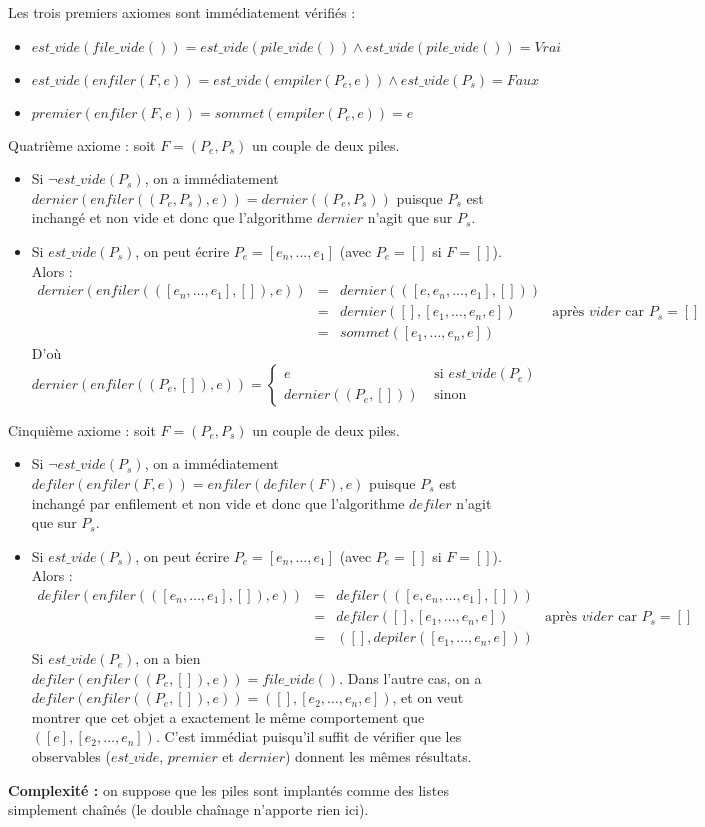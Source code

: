 \documentclass[../main.tex]{subfiles}
\begin{document}
Les trois premiers axiomes sont immédiatement vérifiés :
\begin{itemize}
	\item $est\_vide(file\_vide()) = est\_vide(pile\_vide()) \wedge est\_vide(pile\_vide()) = \textit{Vrai}$
	\item $est\_vide(enfiler(F, e)) = est\_vide(empiler(P_e, e)) \wedge est\_vide(P_s) = \textit{Faux}$
	\item $premier(enfiler(F, e)) = sommet(empiler(P_e, e)) = e$
\end{itemize}
Quatrième axiome : soit $F = (P_e, P_s)$ un couple de deux piles. 
\begin{itemize}
	\item Si $\neg est\_vide(P_s)$, on a immédiatement $dernier(enfiler((P_e, P_s), e)) = dernier((P_e, P_s))$ puisque $P_s$ est inchangé et non vide et donc que l'algorithme $dernier$ n'agit que sur $P_s$.
	\item Si $est\_vide(P_s)$, on peut écrire $P_e = [e_n, \dots, e_1]$ (avec $P_e = []$ si $F = []$). Alors :
$$\begin{array}{lcll}
dernier(enfiler(([e_n, \dots, e_1], []), e)) & = & dernier(([e, e_n, \dots, e_1], [])) \\
& = & dernier([], [e_1, \dots, e_n, e]) & \text{après $vider$ car $P_s = []$} \\
& = & sommet([e_1, \dots, e_n, e])
\end{array}
$$
D'où $dernier(enfiler((P_e, []), e)) = \left\{\begin{array}{ll}e & \text{ si } est\_vide(P_e)\\ dernier((P_e, [])) & \text{ sinon}\end{array}\right.$
\end{itemize}
Cinquième axiome : soit $F = (P_e, P_s)$ un couple de deux piles.
\begin{itemize}
	\item Si $\neg est\_vide(P_s)$, on a immédiatement $defiler(enfiler(F, e)) = enfiler(defiler(F), e)$ puisque $P_s$ est inchangé par enfilement et non vide et donc que l'algorithme $defiler$ n'agit que sur $P_s$.
	\item Si $est\_vide(P_s)$, on peut écrire $P_e = [e_n, \dots, e_1]$ (avec $P_e = []$ si $F = []$). Alors :
	$$\begin{array}{lcll}
defiler(enfiler(([e_n, \dots, e_1], []), e)) & = & defiler(([e, e_n, \dots, e_1], [])) \\
& = & defiler([], [e_1, \dots, e_n, e]) & \text{après $vider$ car $P_s = []$} \\
& = & ([], depiler([e_1, \dots, e_n, e]))
\end{array}
$$
Si $est\_vide(P_e)$, on a bien $defiler(enfiler((P_e, []), e)) = file\_vide()$. Dans l'autre cas, on a $defiler(enfiler((P_e, []), e)) = ([], [e_2, \dots, e_n, e])$, et on veut montrer que cet objet a exactement le même comportement que $([e], [e_2, \dots, e_n])$. C'est immédiat puisqu'il suffit de vérifier que les observables ($est\_vide$, $premier$ et $dernier$) donnent les mêmes résultats.
\end{itemize}
\textbf{Complexité :} on suppose que les piles sont implantés comme des listes simplement chaînés (le double chaînage n'apporte rien ici).
\end{document}
